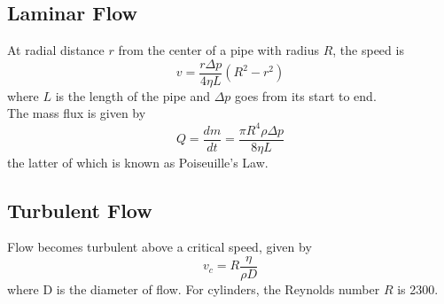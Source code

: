 \documentclass[../PhysicsFormulae.tex]{subfiles}
\begin{document}
\subsection{Laminar Flow}
At radial distance $r$ from the center of a pipe with radius $R$, the speed is
\[ v = \frac{r \Delta p}{4 \eta L}(R^2 - r^2) \]
where $L$ is the length of the pipe and $\Delta p$ goes from its start to end. \\
The mass flux is given by
\[ Q = \frac{dm}{dt} = \frac{\pi R^4 \rho \Delta p}{8\eta L} \]
the latter of which is known as Poiseuille's Law. 

\subsection{Turbulent Flow}
Flow becomes turbulent above a critical speed, given by
\[ v_c = R\frac{\eta}{\rho D} \]
where D is the diameter of flow. For cylinders, the Reynolds number $R$ is 2300. 
\end{document}
